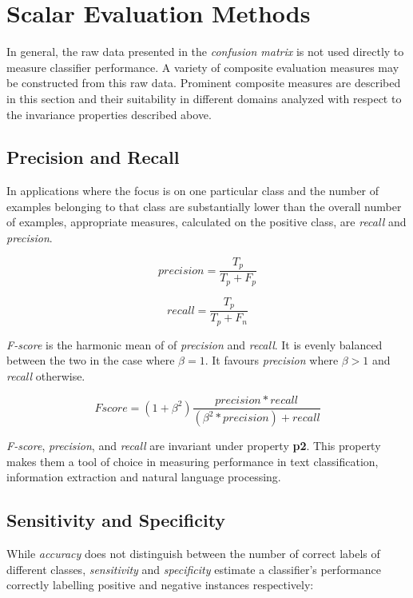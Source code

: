 \documentclass[10pt]{unbthesis}
\begin{document}
\section{Scalar Evaluation Methods}
In general, the raw data presented in the \textit{confusion matrix} is
not used directly to measure classifier performance. A variety of
composite evaluation measures may be constructed from this raw
data. Prominent composite measures are described in this section and
their suitability in different domains analyzed with respect to the
invariance properties described above.

\subsection{Precision and Recall}
In applications where the focus is on one particular class and the
number of examples belonging to that class are substantially lower
than the overall number of examples, appropriate measures, calculated
on the positive class, are \textit{recall} and \textit{precision}.

\begin{equation}
\label{equ:precision}
precision = \frac{T_p}{T_p + F_p}
\end{equation}

\begin{equation}
\label{equ:recall}
recall = \frac{T_p}{T_p + F_n}
\end{equation}

\textit{F-score} is the harmonic mean of of \textit{precision} and
\textit{recall}. It is evenly balanced between the two in the case
where \(\beta = 1\). It favours \textit{precision} where \(\beta > 1\)
and \textit{recall} otherwise.

\begin{equation}
\label{equ:fscore}
Fscore = (1 + \beta^2)\frac{precision * recall}{(\beta^2 * precision) + recall}
\end{equation}

\textit{F-score}, \textit{precision}, and \textit{recall} are
invariant under property \textbf{p2}. This property makes them a tool
of choice in measuring performance in text classification, information
extraction and natural language processing.


\subsection{Sensitivity and Specificity}
While \textit{accuracy} does not distinguish between the number of
correct labels of different classes, \textit{sensitivity} and
\textit{specificity} estimate a classifier's performance correctly
labelling positive and negative instances respectively:
\end{document}

